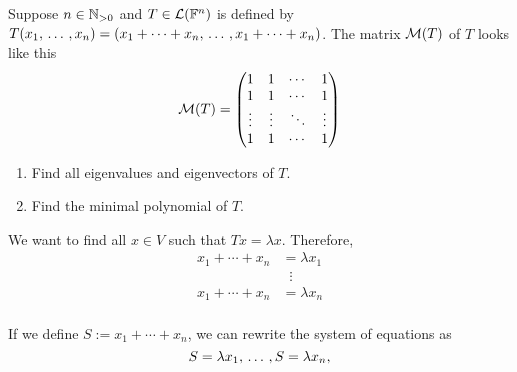 \begin{xrcs}
  Suppose $n \in \mathbb{N}_{>0}$ and $T \in \mathcal{L}(\mathbb{F}^n)$ is defined by $T(x_1 , {\, \ldots \,\,}, x_n) = (x_1 + \cdots + x_n, {\, \ldots \,\,}, x_1 + \cdots + x_n)$. The matrix $\mathcal{M} (T)$ of $T$ looks like this
  \begin{equation}
    \mathcal{M} (T) =
    \begin{pmatrix}
      1 & 1 & \cdots & 1 \\
      1 & 1 & \cdots & 1 \\
      \vdots & \vdots & \ddots & \vdots \\
      1 & 1 & \cdots & 1
    \end{pmatrix}
  \end{equation}

  \begin{enumerate}
    \item Find all eigenvalues and eigenvectors of $T$.
    \item Find the minimal polynomial of $T$.
  \end{enumerate}

  \begin{xsol}
    We want to find all $x \in V$ such that $Tx = \lambda x$. Therefore,
    \begin{equation}
      \begin{aligned}
        x_1 + \cdots + x_n &= \lambda x_1 \\
        & \; \; \vdots \\
        x_1 + \cdots + x_n &= \lambda x_n \\
      \end{aligned}
    \end{equation}

    If we define $S := x_1 + \cdots + x_n$, we can rewrite the system of equations as
    \begin{equation}
      S= \lambda x_1, {\, \ldots \,\,}, S= \lambda x_n,
    \end{equation}


\end{xsol}
\end{xrcs}
